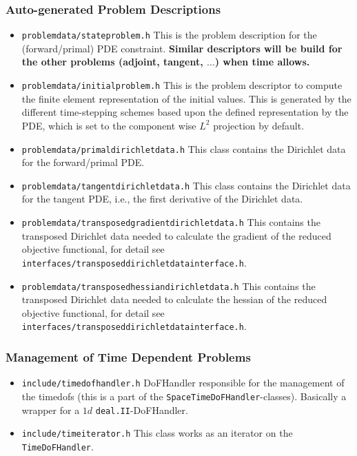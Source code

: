 \subsubsection{Auto-generated Problem Descriptions}
\begin{itemize}
  \item \texttt{problemdata/stateproblem.h} This is the problem description for the (forward/primal) PDE constraint.
    {\bf Similar descriptors will be build for the other problems (adjoint, tangent, $\ldots$) when time allows.}
  \item \texttt{problemdata/initialproblem.h} This is the problem descriptor to compute the finite element representation
    of the initial values. This is generated by the different time-stepping schemes based upon the defined 
    representation by the PDE, which is set to the component wise $L^2$ projection by default.
  \item \texttt{problemdata/primaldirichletdata.h} This class contains the Dirichlet data for the 
    forward/primal PDE.
  \item \texttt{problemdata/tangentdirichletdata.h} This class contains the Dirichlet data for the tangent PDE, i.e.,
    the first derivative of the Dirichlet data.
  \item \texttt{problemdata/transposedgradientdirichletdata.h} This contains the transposed Dirichlet data needed 
    to calculate the gradient of the reduced objective functional, 
    for detail see \texttt{interfaces/transposeddirichletdatainterface.h}.
  \item \texttt{problemdata/transposedhessiandirichletdata.h} This contains the transposed Dirichlet data needed 
    to calculate the hessian of the reduced objective functional, 
    for detail see \texttt{interfaces/transposeddirichletdatainterface.h}.
\end{itemize}
\subsubsection{Management of Time Dependent Problems}
\begin{itemize}
\item \texttt{include/timedofhandler.h} DoFHandler responsible for the management of the timedofs (this is a part of the \texttt{SpaceTimeDoFHandler}-classes). Basically a wrapper for a $1d$ \texttt{deal.II}-DoFHandler.
\item \texttt{include/timeiterator.h} This class works as an iterator on the \texttt{TimeDoFHandler}.                 
\end{itemize}
